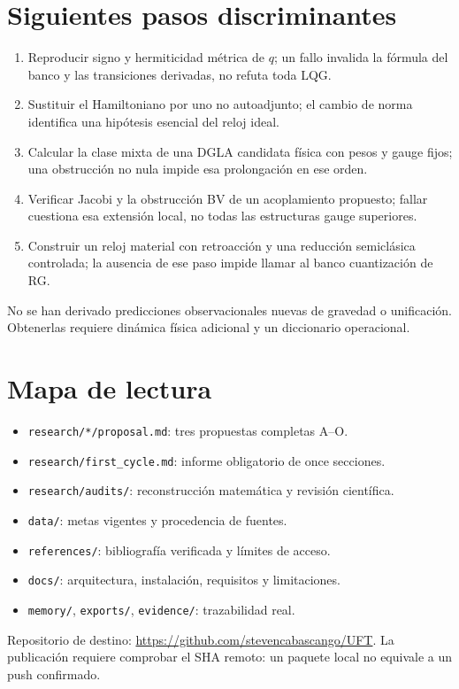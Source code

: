 \documentclass[11pt,a4paper]{article}
\begin{document}
\section{Siguientes pasos discriminantes}
\begin{enumerate}
\item Reproducir signo y hermiticidad métrica de $q$; un fallo invalida la fórmula
del banco y las transiciones derivadas, no refuta toda LQG.
\item Sustituir el Hamiltoniano por uno no autoadjunto; el cambio de norma
identifica una hipótesis esencial del reloj ideal.
\item Calcular la clase mixta de una DGLA candidata física con pesos y gauge
fijos; una obstrucción no nula impide esa prolongación en ese orden.
\item Verificar Jacobi y la obstrucción BV de un acoplamiento propuesto; fallar
cuestiona esa extensión local, no todas las estructuras gauge superiores.
\item Construir un reloj material con retroacción y una reducción semiclásica
controlada; la ausencia de ese paso impide llamar al banco cuantización de RG.
\end{enumerate}
No se han derivado predicciones observacionales nuevas de gravedad o unificación.
Obtenerlas requiere dinámica física adicional y un diccionario operacional.

\section{Mapa de lectura}
\begin{itemize}
\item \texttt{research/*/proposal.md}: tres propuestas completas A--O.
\item \texttt{research/first\_cycle.md}: informe obligatorio de once secciones.
\item \texttt{research/audits/}: reconstrucción matemática y revisión científica.
\item \texttt{data/}: metas vigentes y procedencia de fuentes.
\item \texttt{references/}: bibliografía verificada y límites de acceso.
\item \texttt{docs/}: arquitectura, instalación, requisitos y limitaciones.
\item \texttt{memory/}, \texttt{exports/}, \texttt{evidence/}: trazabilidad real.
\end{itemize}
Repositorio de destino: \url{https://github.com/stevencabascango/UFT}.
La publicación requiere comprobar el SHA remoto: un paquete local no equivale a
un push confirmado.
\end{document}
